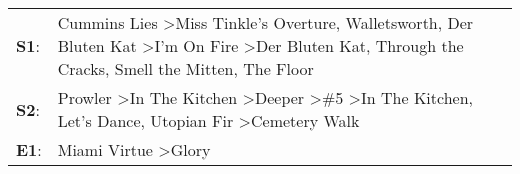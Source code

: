 \begin{supertabular}{p{0.03\textwidth}p{0.92\textwidth}}
 \textbf{S1}:  &  Cummins Lies\textsuperscript{} \textgreater \enspace Miss Tinkle's Overture\textsuperscript{}, \enspace Walletsworth\textsuperscript{}, \enspace Der Bluten Kat\textsuperscript{} \textgreater \enspace I'm On Fire\textsuperscript{} \textgreater \enspace Der Bluten Kat\textsuperscript{}, \enspace Through the Cracks\textsuperscript{}, \enspace Smell the Mitten\textsuperscript{}, \enspace The Floor\textsuperscript{}  \enspace  \\
 \textbf{S2}:  &                                                        Prowler\textsuperscript{} \textgreater \enspace In The Kitchen\textsuperscript{} \textgreater \enspace Deeper\textsuperscript{} \textgreater \enspace \#5\textsuperscript{} \textgreater \enspace In The Kitchen\textsuperscript{}, \enspace Let's Dance\textsuperscript{}, \enspace Utopian Fir\textsuperscript{} \textgreater \enspace Cemetery Walk\textsuperscript{}  \enspace  \\
 \textbf{E1}:  &                                                                                                                                                                                                                                                                                                                                                    Miami Virtue\textsuperscript{} \textgreater \enspace Glory\textsuperscript{}  \enspace  \\
\end{supertabular}
